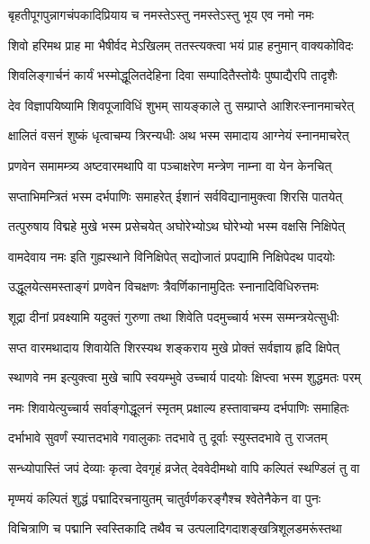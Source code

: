 \twolineshloka
{बृहतीपूगपुन्नागचंपकादिप्रियाय च}
{नमस्तेऽस्तु नमस्तेऽस्तु भूय एव नमो नमः}%

\twolineshloka
{शिवो हरिमथ प्राह मा भैषीर्वद मेऽखिलम्}
{ततस्त्यक्त्वा भयं प्राह हनुमान् वाक्यकोविदः}%

\twolineshloka
{शिवलिङ्गार्चनं कार्यं भस्मोद्धूलितदेहिना}
{दिवा सम्पादितैस्तोयैः पुष्पाद्यैरपि तादृशैः}%

\twolineshloka
{देव विज्ञापयिष्यामि शिवपूजाविधिं शुभम्}
{सायङ्काले तु सम्प्राप्ते आशिरःस्नानमाचरेत्}%

\twolineshloka
{क्षालितं वसनं शुष्कं धृत्वाचम्य त्रिरन्यधीः}
{अथ भस्म समादाय आग्नेयं स्नानमाचरेत्}%

\twolineshloka
{प्रणवेन समामम्त्र्य अष्टवारमथापि वा}
{पञ्चाक्षरेण मन्त्रेण नाम्ना वा येन केनचित्}%

\twolineshloka
{सप्ताभिमन्त्रितं भस्म दर्भपाणिः समाहरेत्}
{ईशानं सर्वविद्यानामुक्त्वा शिरसि पातयेत्}%

\twolineshloka
{तत्पुरुषाय विद्महे मुखे भस्म प्रसेचयेत्}
{अघोरेभ्योऽथ घोरेभ्यो भस्म वक्षसि निक्षिपेत्}%

\twolineshloka
{वामदेवाय नमः इति गुह्यस्थाने विनिक्षिपेत्}
{सद्योजातं प्रपद्यामि निक्षिपेदथ पादयोः}%

\twolineshloka
{उद्धूलयेत्समस्ताङ्गं प्रणवेन विचक्षणः}
{त्रैवर्णिकानामुदितः स्नानादिविधिरुत्तमः}%

\twolineshloka
{शूद्रा दीनां प्रवक्ष्यामि यदुक्तं गुरुणा तथा}
{शिवेति पदमुच्चार्य भस्म सम्मन्त्रयेत्सुधीः}%

\twolineshloka
{सप्त वारमथादाय शिवायेति शिरस्यथ}
{शङ्कराय मुखे प्रोक्तं सर्वज्ञाय हृदि क्षिपेत्}%

\twolineshloka
{स्थाणवे नम इत्युक्त्वा मुखे चापि स्वयम्भुवे}
{उच्चार्य पादयोः क्षिप्त्वा भस्म शुद्धमतः परम्}%

\twolineshloka
{नमः शिवायेत्युच्चार्य सर्वाङ्गोद्धूलनं स्मृतम्}
{प्रक्षाल्य हस्तावाचम्य दर्भपाणिः समाहितः}%

\twolineshloka
{दर्भाभावे सुवर्णं स्यात्तदभावे गवालुकाः}
{तदभावे तु दूर्वाः स्युस्तदभावे तु राजतम्}%

\twolineshloka
{सन्ध्योपास्तिं जपं देव्याः कृत्वा देवगृहं व्रजेत्}
{देववेदीमथो वापि कल्पितं स्थण्डिलं तु वा}%

\twolineshloka
{मृण्मयं कल्पितं शुद्धं पद्मादिरचनायुतम्}
{चातुर्वर्णकरङ्गैश्च श्वेतेनैकेन वा पुनः}%

\twolineshloka
{विचित्राणि च पद्मानि स्वस्तिकादि तथैव च}
{उत्पलादिगदाशङ्खत्रिशूलडमरूंस्तथा}%

